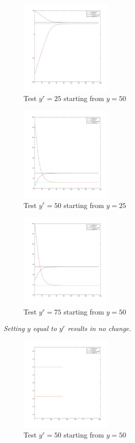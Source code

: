 \documentclass{article}
\begin{document}
\begin{figure}[H]
    \centering
    \includegraphics[width=0.4\textwidth]{yr_25_uss.jpg}
    \caption{Test $y^r = 25$ starting from $y=50$}
    \label{fig:yr25}
\end{figure}
\begin{figure}[H]
    \centering
    \includegraphics[width=0.4\textwidth]{yr_50_uss_25.jpg}
    \caption{Test $y^r = 50$ starting from $y=25$}
    \label{fig:yr50}
\end{figure}
\begin{figure}[H]
    \centering
    \includegraphics[width=0.4\textwidth]{yr_75_uss.jpg}
    \caption{Test $y^r = 75$ starting from $y=50$}
    \label{fig:yr75}
\end{figure}

\textit{Setting $y$ equal to $y^r$ results in no change.}
\begin{figure}[H]
    \centering
    \includegraphics[width=0.4\textwidth]{yr_50_uss_50.jpg}
    \caption{Test $y^r = 50$ starting from $y=50$}
    \label{fig:yisyr}
\end{figure}
\end{document}
